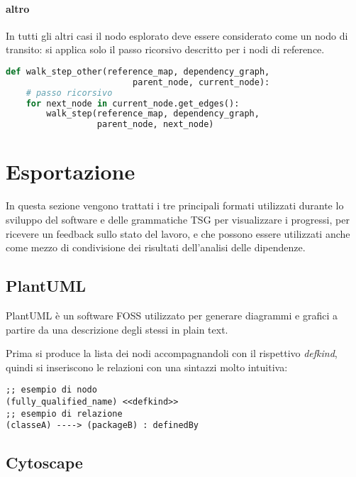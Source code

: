 \paragraph{altro}

In tutti gli altri casi il nodo esplorato deve essere considerato come un nodo di transito: si applica solo il passo ricorsivo descritto per i nodi di reference.

\begin{lstlisting}[language=Python, caption="Pseudocodice della procedura walk\_step\_other"]
def walk_step_other(reference_map, dependency_graph,
                         parent_node, current_node):
    # passo ricorsivo
    for next_node in current_node.get_edges():
        walk_step(reference_map, dependency_graph,
                  parent_node, next_node)
\end{lstlisting}

\section{Esportazione}

In questa sezione vengono trattati i tre principali formati utilizzati durante lo sviluppo del software e delle grammatiche TSG per visualizzare i progressi, per ricevere un feedback sullo stato del lavoro, e che possono essere utilizzati anche come mezzo di condivisione dei risultati dell'analisi delle dipendenze.

\subsection{PlantUML}

PlantUML \cite{PlantUML} \`e un software FOSS utilizzato per generare diagrammi e grafici a partire da una descrizione degli stessi in plain text.

Prima si produce la lista dei nodi accompagnandoli con il rispettivo \emph{defkind}, quindi si inseriscono le relazioni con una sintazzi molto intuitiva:

\begin{lstlisting}
;; esempio di nodo
(fully_qualified_name) <<defkind>>
;; esempio di relazione
(classeA) ----> (packageB) : definedBy
\end{lstlisting}

\subsection{Cytoscape}


